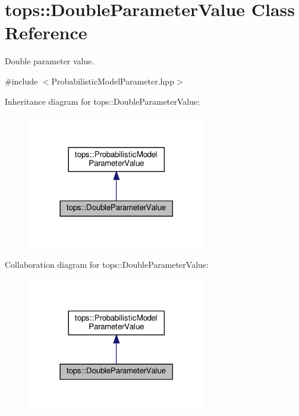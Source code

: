 \hypertarget{classtops_1_1DoubleParameterValue}{}\section{tops\+:\+:Double\+Parameter\+Value Class Reference}
\label{classtops_1_1DoubleParameterValue}


Double parameter value.  




{\ttfamily \#include $<$Probabilistic\+Model\+Parameter.\+hpp$>$}



Inheritance diagram for tops\+:\+:Double\+Parameter\+Value\+:
\nopagebreak
\begin{figure}[H]
\begin{center}
\leavevmode
\includegraphics[width=222pt]{classtops_1_1DoubleParameterValue__inherit__graph}
\end{center}
\end{figure}


Collaboration diagram for tops\+:\+:Double\+Parameter\+Value\+:
\nopagebreak
\begin{figure}[H]
\begin{center}
\leavevmode
\includegraphics[width=222pt]{classtops_1_1DoubleParameterValue__coll__graph}
\end{center}
\end{figure}
